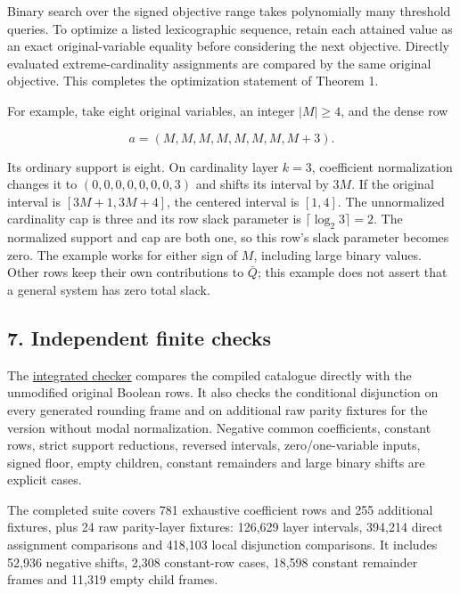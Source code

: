 Binary search over the signed objective range takes polynomially many threshold queries. To optimize a listed lexicographic sequence, retain each attained value as an exact original-variable equality before considering the next objective. Directly evaluated extreme-cardinality assignments are compared by the same original objective. This completes the optimization statement of Theorem 1.

For example, take eight original variables, an integer \(|M|\ge4\), and the dense row

\[
a=(M,M,M,M,M,M,M,M+3).
\]

Its ordinary support is eight. On cardinality layer \(k=3\), coefficient normalization changes it to \((0,0,0,0,0,0,0,3)\) and shifts its interval by \(3M\). If the original interval is \([3M+1,3M+4]\), the centered interval is \([1,4]\). The unnormalized cardinality cap is three and its row slack parameter is \(\lceil\log_2 3\rceil=2\). The normalized support and cap are both one, so this row's slack parameter becomes zero. The example works for either sign of \(M\), including large binary values. Other rows keep their own contributions to \(\bar Q\); this example does not assert that a general system has zero total slack.

\hypertarget{af-2bf1c1784c-independent-finite-checks}{%
\subsection{7. Independent finite checks}\label{af-2bf1c1784c-independent-finite-checks}}

The \href{https://github.com/icekylinx/algorithm-frontier/blob/main/problems/boolean-linear-compiler/verify/check_cardinality_compiler.py}{integrated checker} compares the compiled catalogue directly with the unmodified original Boolean rows. It also checks the conditional disjunction on every generated rounding frame and on additional raw parity fixtures for the version without modal normalization. Negative common coefficients, constant rows, strict support reductions, reversed intervals, zero/one-variable inputs, signed floor, empty children, constant remainders and large binary shifts are explicit cases.

The completed suite covers 781 exhaustive coefficient rows and 255 additional fixtures, plus 24 raw parity-layer fixtures: 126,629 layer intervals, 394,214 direct assignment comparisons and 418,103 local disjunction comparisons. It includes 52,936 negative shifts, 2,308 constant-row cases, 18,598 constant remainder frames and 11,319 empty child frames.

